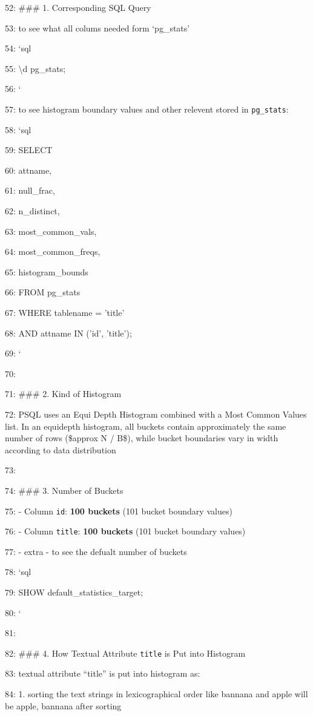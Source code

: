 \documentclass[11pt,a4paper]{article}
\begin{document}
52: \#\#\# 1. Corresponding SQL Query

53: to see what all colums needed form `pg\_stats'

54: \texttt{}`sql

55: \textbackslash{}d pg\_stats;

56: \texttt{}`

57: to see histogram boundary values and other relevent  stored in \texttt{pg\_stats}:

58: \texttt{}`sql

59: SELECT

60:     attname,

61:     null\_frac,

62:     n\_distinct,

63:     most\_common\_vals,

64:     most\_common\_freqs,

65:     histogram\_bounds

66: FROM pg\_stats

67: WHERE tablename = 'title'

68:   AND attname IN ('id', 'title');

69: \texttt{}`

70:

71: \#\#\# 2. Kind of Histogram

72: PSQL uses an Equi Depth Histogram combined with a Most Common Values list. In an equidepth histogram, all buckets contain approximately the same number of rows (\$approx N / B\$), while bucket boundaries vary in width according to data distribution

73:

74: \#\#\# 3. Number of Buckets

75: - Column \texttt{id}: \textbf{100 buckets} (101 bucket boundary values)

76: - Column \texttt{title}: \textbf{100 buckets} (101 bucket boundary values)

77: - extra -  to see the defualt number of buckets

78: \texttt{}`sql

79: SHOW default\_statistics\_target;

80: \texttt{}`

81:

82: \#\#\# 4. How Textual Attribute \texttt{title} is Put into Histogram

83: textual attribute “title” is put into histogram as:

84: 1. sorting the text strings in lexicographical order like bannana and apple will be apple, bannana after sorting
\end{document}
